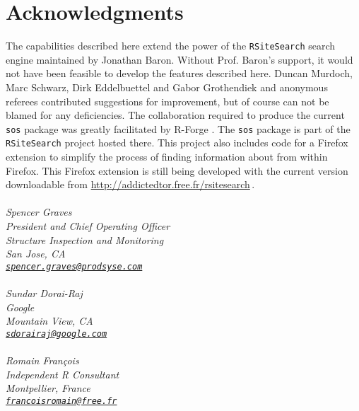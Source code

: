 \section*{Acknowledgments}
The capabilities described here extend the power of the
{\tt RSiteSearch} search engine maintained by Jonathan Baron.
Without Prof. Baron's support, it would not have been feasible
to develop the features described here. Duncan Murdoch, Marc Schwarz,
Dirk Eddelbuettel and Gabor Grothendiek and anonymous
referees contributed suggestions for improvement, but of course
can not be blamed for any deficiencies.  The collaboration
required to produce the current {\tt sos} package was greatly
facilitated by R-Forge \citep{RFORGE09URL}. The {\tt sos} package
is part of the {\tt RSiteSearch} project hosted there.  This project
also includes code for a Firefox extension to simplify the process of
finding information about \R{} from within Firefox.  This Firefox
extension is still being developed with the current version
downloadable from \url{http://addictedtor.free.fr/rsitesearch}\,.
\\ \\
\emph{Spencer Graves \\
President and Chief Operating Officer \\
Structure Inspection and Monitoring \\
San Jose, CA \\
{\tt\href{mailto:spencer.graves@prodsyse.com}{spencer.graves@prodsyse.com}} }
\\ \\
\emph{Sundar Dorai-Raj \\
Google \\
Mountain View, CA \\
{\tt\href{mailto:sdorairaj@google.com}{sdorairaj@google.com}} }
\\ \\
\emph{Romain Fran{\c c}ois \\
Independent R Consultant \\
Montpellier, France \\
{\tt\href{mailto:francoisromain@free.fr}{francoisromain@free.fr}} }
